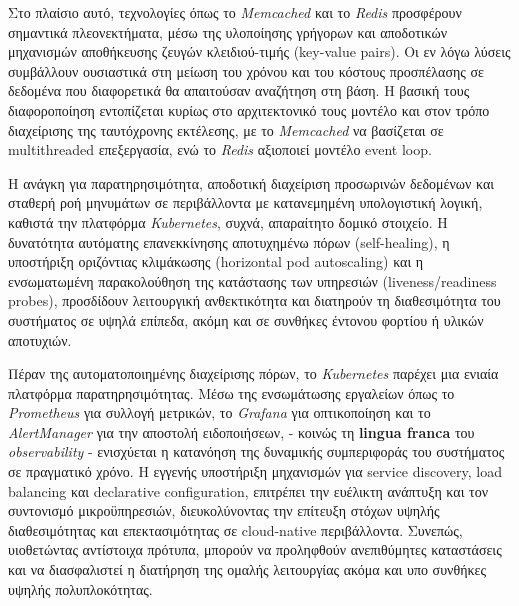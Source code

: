 Στο πλαίσιο αυτό, τεχνολογίες όπως το \textit{Memcached} \cite{memcachedfb} και
το \textit{Redis} \cite{redisia} προσφέρουν σημαντικά πλεονεκτήματα, μέσω της
υλοποίησης γρήγορων και αποδοτικών μηχανισμών αποθήκευσης ζευγών κλειδιού-τιμής
(key-value pairs). Οι εν λόγω λύσεις συμβάλλουν ουσιαστικά στη μείωση του
χρόνου και του κόστους προσπέλασης σε δεδομένα που διαφορετικά θα απαιτούσαν
αναζήτηση στη βάση. Η βασική τους διαφοροποίηση εντοπίζεται κυρίως στο
αρχιτεκτονικό τους μοντέλο και στον τρόπο διαχείρισης της ταυτόχρονης
εκτέλεσης, με το \textit{Memcached} να βασίζεται σε multithreaded επεξεργασία,
ενώ το \textit{Redis} αξιοποιεί μοντέλο event loop.

Η ανάγκη για παρατηρησιμότητα, αποδοτική διαχείριση προσωρινών δεδομένων και
σταθερή ροή μηνυμάτων σε περιβάλλοντα με κατανεμημένη υπολογιστική λογική,
καθιστά την πλατφόρμα \textit{Kubernetes}, συχνά, απαραίτητο δομικό στοιχείο. Η
δυνατότητα αυτόματης επανεκκίνησης αποτυχημένω πόρων (self-healing), η
υποστήριξη οριζόντιας κλιμάκωσης (horizontal pod autoscaling) και η
ενσωματωμένη παρακολούθηση της κατάστασης των υπηρεσιών (liveness/readiness
probes), προσδίδουν λειτουργική ανθεκτικότητα και διατηρούν τη διαθεσιμότητα
του συστήματος σε υψηλά επίπεδα, ακόμη και σε συνθήκες έντονου φορτίου ή υλικών
αποτυχιών.

Πέραν της αυτοματοποιημένης διαχείρισης πόρων, το \textit{Kubernetes} παρέχει
μια ενιαία πλατφόρμα παρατηρησιμότητας. Μέσω της ενσωμάτωσης εργαλείων όπως το
\textit{Prometheus} για συλλογή μετρικών, το \textit{Grafana} για οπτικοποίηση
και το \textit{AlertManager} για την αποστολή ειδοποιήσεων, \cite{inframon} -
κοινώς τη \textbf{lingua franca} του \textit{observability} - ενισχύεται η
κατανόηση της δυναμικής συμπεριφοράς του συστήματος σε πραγματικό χρόνο. Η
εγγενής υποστήριξη μηχανισμών για service discovery, load balancing και
declarative configuration, επιτρέπει την ευέλικτη ανάπτυξη και τον συντονισμό
μικροϋπηρεσιών, διευκολύνοντας την επίτευξη στόχων υψηλής διαθεσιμότητας και
επεκτασιμότητας σε cloud-native περιβάλλοντα. Συνεπώς, υιοθετώντας αντίστοιχα
πρότυπα, μπορούν να προληφθούν ανεπιθύμητες καταστάσεις και να διασφαλιστεί η
διατήρηση της ομαλής λειτουργίας ακόμα και υπο συνθήκες υψηλής πολυπλοκότητας.
